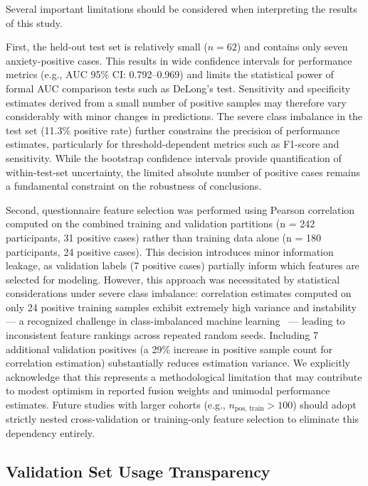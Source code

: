 \documentclass[10pt,letterpaper]{article}
\begin{document}
Several important limitations should be considered when interpreting the results of this study.

First, the held-out test set is relatively small ($n = 62$) and contains only seven anxiety-positive cases. This results in wide confidence intervals for performance metrics (e.g., AUC 95\% CI: 0.792--0.969) and limits the statistical power of formal AUC comparison tests such as DeLong's test. Sensitivity and specificity estimates derived from a small number of positive samples may therefore vary considerably with minor changes in predictions. The severe class imbalance in the test set (11.3\% positive rate) further constrains the precision of performance estimates, particularly for threshold-dependent metrics such as F1-score and sensitivity. While the bootstrap confidence intervals provide quantification of within-test-set uncertainty, the limited absolute number of positive cases remains a fundamental constraint on the robustness of conclusions.

Second, questionnaire feature selection was performed using Pearson correlation computed on the combined training and validation partitions (n = 242 participants, 31 positive cases) rather than training data alone (n = 180 participants, 24 positive cases). This decision introduces minor information leakage, as validation labels (7 positive cases) partially inform which features are selected for modeling. However, this approach was necessitated by statistical considerations under severe class imbalance: correlation estimates computed on only 24 positive training samples exhibit extremely high variance and instability --- a recognized challenge in class-imbalanced machine learning~\cite{ref56} --- leading to inconsistent feature rankings across repeated random seeds. Including 7 additional validation positives (a 29\% increase in positive sample count for correlation estimation) substantially reduces estimation variance. We explicitly acknowledge that this represents a methodological limitation that may contribute to modest optimism in reported fusion weights and unimodal performance estimates. Future studies with larger cohorts (e.g., $n_{\text{pos, train}} > 100$) should adopt strictly nested cross-validation or training-only feature selection to eliminate this dependency entirely.

\subsection*{Validation Set Usage Transparency}
\end{document}
